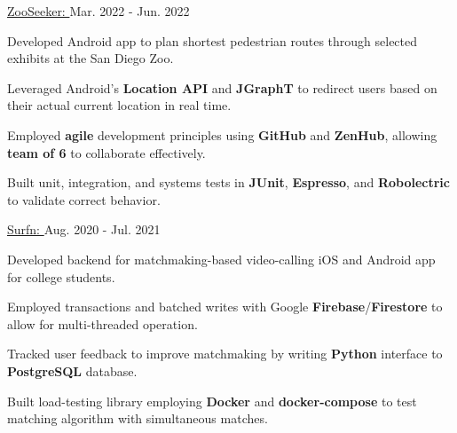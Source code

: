 
\begin{cventries}

  \cvproject
  {\href{https://github.com/Auroric/ZooSeeker}{ZooSeeker: }} %
  {Mar. 2022 - Jun. 2022} %
  {
    \begin{cvitems} %
      \item {Developed Android app to plan shortest pedestrian routes through selected exhibits at the San Diego Zoo.}
      \item {Leveraged Android's \textbf{Location API} and \textbf{JGraphT} to redirect users based on their actual current location in real time.}
      \item { Employed \textbf{agile} development principles using \textbf{GitHub} and \textbf{ZenHub}, allowing \textbf{team of 6} to collaborate effectively. }
      \item {Built unit, integration, and systems tests in \textbf{JUnit}, \textbf{Espresso}, and \textbf{Robolectric} to validate correct behavior.}
    \end{cvitems}
  }

  \cvproject
    {\href{https://surfn.app}{Surfn: }} %
    {Aug. 2020 - Jul. 2021} %
    {
      \begin{cvitems} %
        \item {Developed backend for matchmaking-based video-calling iOS and Android app for college students.}
        \item {Employed transactions and batched writes with Google \textbf{Firebase}/\textbf{Firestore} to allow for multi-threaded operation.}
        \item {Tracked user feedback to improve matchmaking by writing \textbf{Python} interface to \textbf{PostgreSQL} database.}
        \item {Built load-testing library employing \textbf{Docker} and \textbf{docker-compose} to test matching algorithm with simultaneous matches.}
      \end{cvitems}
    }
  
\end{cventries}